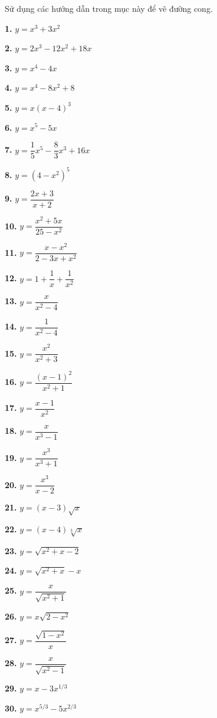 \documentclass[10pt]{article}
\newcommand{\exrow}[3][0.32em]{%
  \noindent\parbox[t]{0.485\linewidth}{#2}\hfill\parbox[t]{0.485\linewidth}{#3}\par
  \vspace{#1}%
}
\begin{document}
\noindent
\begin{minipage}[t]{0.485\textwidth}
  \vspace{0pt}
  \quad Sử dụng các hướng dẫn trong mục này để vẽ đường cong.

  \vspace{0.45em}
  \exrow{\textbf{1.} $y = x^3 + 3x^2$}{\textbf{2.} $y = 2x^3 - 12x^2 + 18x$}
  \exrow{\textbf{3.} $y = x^4 - 4x$}{\textbf{4.} $y = x^4 - 8x^2 + 8$}
  \exrow{\textbf{5.} $y = x(x - 4)^3$}{\textbf{6.} $y = x^5 - 5x$}
  \exrow[0.5em]{\textbf{7.} $y = \dfrac{1}{5}x^5 - \dfrac{8}{3}x^3 + 16x$}{\textbf{8.} $y = (4 - x^2)^5$}
  \exrow[0.5em]{\textbf{9.} $y = \dfrac{2x + 3}{x + 2}$}{\textbf{10.} $y = \dfrac{x^2 + 5x}{25 - x^2}$}
  \exrow[0.5em]{\textbf{11.} $y = \dfrac{x - x^2}{2 - 3x + x^2}$}{\textbf{12.} $y = 1 + \dfrac{1}{x} + \dfrac{1}{x^2}$}
  \exrow[0.5em]{\textbf{13.} $y = \dfrac{x}{x^2 - 4}$}{\textbf{14.} $y = \dfrac{1}{x^2 - 4}$}
  \exrow[0.5em]{\textbf{15.} $y = \dfrac{x^2}{x^2 + 3}$}{\textbf{16.} $y = \dfrac{(x - 1)^2}{x^2 + 1}$}
  \exrow[0.5em]{\textbf{17.} $y = \dfrac{x - 1}{x^2}$}{\textbf{18.} $y = \dfrac{x}{x^3 - 1}$}
  \exrow[0.5em]{\textbf{19.} $y = \dfrac{x^3}{x^3 + 1}$}{\textbf{20.} $y = \dfrac{x^3}{x - 2}$}
  \exrow{\textbf{21.} $y = (x - 3)\sqrt{x}$}{\textbf{22.} $y = (x - 4)\sqrt[3]{x}$}
  \exrow{\textbf{23.} $y = \sqrt{x^2 + x - 2}$}{\textbf{24.} $y = \sqrt{x^2 + x} - x$}
  \exrow[0.5em]{\textbf{25.} $y = \dfrac{x}{\sqrt{x^2 + 1}}$}{\textbf{26.} $y = x\sqrt{2 - x^2}$}
  \exrow[0.5em]{\textbf{27.} $y = \dfrac{\sqrt{1 - x^2}}{x}$}{\textbf{28.} $y = \dfrac{x}{\sqrt{x^2 - 1}}$}
  \exrow{\textbf{29.} $y = x - 3x^{1/3}$}{\textbf{30.} $y = x^{5/3} - 5x^{2/3}$}
\end{minipage}%
\hfill
\end{document}

